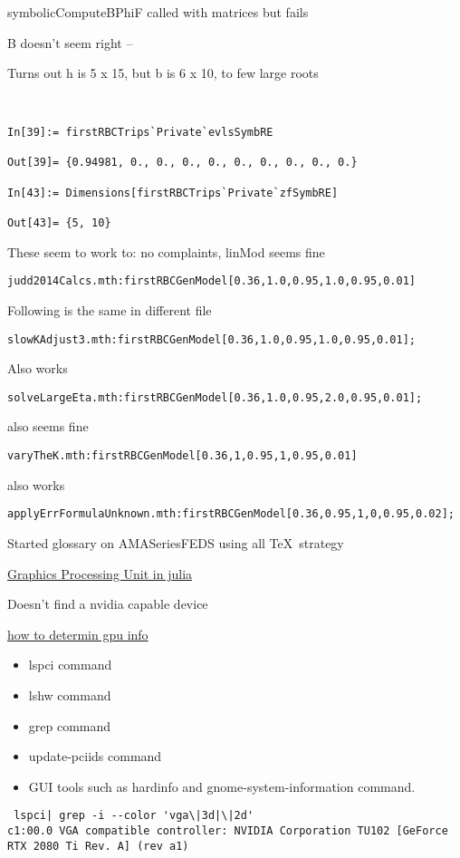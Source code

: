 \documentclass[hyperref,idxtotoc]{labbook}
\begin{document}
symbolicComputeBPhiF called with matrices but fails

B doesn't seem right -- 

Turns out  h is 5 x 15, but b is 6 x 10,  to few large roots


\begin{verbatim}


In[39]:= firstRBCTrips`Private`evlsSymbRE

Out[39]= {0.94981, 0., 0., 0., 0., 0., 0., 0., 0., 0.}

In[43]:= Dimensions[firstRBCTrips`Private`zfSymbRE]

Out[43]= {5, 10}

\end{verbatim}


These seem to work to: no complaints, linMod seems fine
\begin{verbatim}
judd2014Calcs.mth:firstRBCGenModel[0.36,1.0,0.95,1.0,0.95,0.01]
\end{verbatim}
Following is the same in different file
\begin{verbatim}
slowKAdjust3.mth:firstRBCGenModel[0.36,1.0,0.95,1.0,0.95,0.01];
\end{verbatim}
Also works
\begin{verbatim}
solveLargeEta.mth:firstRBCGenModel[0.36,1.0,0.95,2.0,0.95,0.01];
\end{verbatim}
also seems fine
\begin{verbatim}
varyTheK.mth:firstRBCGenModel[0.36,1,0.95,1,0.95,0.01]
\end{verbatim}
also works
\begin{verbatim}
applyErrFormulaUnknown.mth:firstRBCGenModel[0.36,0.95,1,0,0.95,0.02];
\end{verbatim}







Started glossary on AMASeriesFEDS using all \TeX\ strategy 


\href{https://nextjournal.com/sdanisch/julia-gpu-programming}{Graphics Processing Unit in julia}

Doesn't find a nvidia capable device

\href{https://www.cyberciti.biz/faq/linux-tell-which-graphics-vga-card-installed/}{how to determin gpu info}

\begin{itemize}
\item     lspci command
\item     lshw command
\item     grep command
\item     update-pciids command
\item     GUI tools such as hardinfo and gnome-system-information command.
\end{itemize}
\begin{verbatim}
 lspci| grep -i --color 'vga\|3d|\|2d'
c1:00.0 VGA compatible controller: NVIDIA Corporation TU102 [GeForce RTX 2080 Ti Rev. A] (rev a1)
\end{verbatim}
\end{document}
